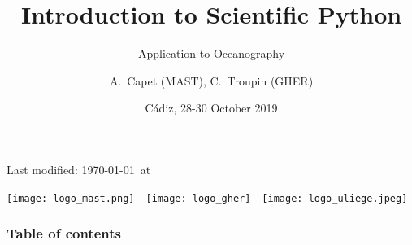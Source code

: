 
\parindent 0cm

\title[Scientific Python]{Introduction to Scientific Python}
\subtitle{Application to Oceanography}
\date[]{Cádiz, 28-30 October 2019}
\author{A.~Capet (MAST), C.~Troupin (GHER)}



\begin{frame}
\centering

\footnotesize
\maketitle
{\scriptsize Last modified: \today\ at \currenttime}
\vfill


\texttt{[image: logo\_mast.png]}~~\texttt{[image: logo\_gher]}~~\texttt{[image: logo\_uliege.jpeg]}


\end{frame}



\begin{frame}
\frametitle{Table of contents}
\end{frame}



%
%
%
%
  


